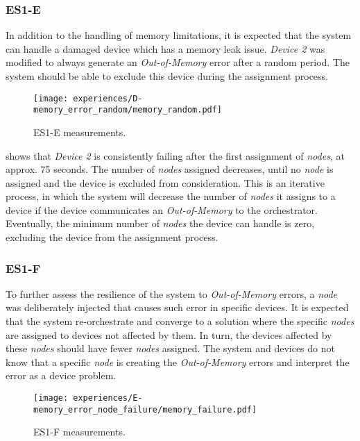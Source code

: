 
\subsubsection{ES1-E}

In addition to the handling of memory limitations, it is expected that the system can handle a damaged device which has a memory leak issue. \textit{Device 2} was modified to always generate an \textit{Out-of-Memory} error after a random period. The system should be able to exclude this device during the assignment process.

\begin{figure}[h]
\centering
\texttt{[image: experiences/D-memory\_error\_random/memory\_random.pdf]}
\caption[ES1-E measurements]{ES1-E measurements.}\label{fig:experiment_d_graph}
\end{figure}

 shows that \textit{Device 2} is consistently failing after the first assignment of \textit{nodes}, at approx. 75 seconds. The number of \textit{nodes} assigned decreases, until no \textit{node} is assigned and the device is excluded from consideration. This is an iterative process, in which the system will decrease the number of \textit{nodes} it assigns to a device if the device communicates an \textit{Out-of-Memory} to the orchestrator. Eventually, the minimum number of \textit{nodes} the device can handle is zero, excluding the device from the assignment process.


\subsubsection{ES1-F}

To further assess the resilience of the system to \textit{Out-of-Memory} errors, a \textit{node} was deliberately injected that causes such error in specific devices. It is expected that the system re-orchestrate and converge to a solution where the specific \textit{nodes} are assigned to devices not affected by them. In turn, the devices affected by these \textit{nodes} should have fewer \textit{nodes} assigned. The system and devices do not know that a specific \textit{node} is creating the \textit{Out-of-Memory} errors and interpret the error as a device problem.

\begin{figure}[H]
\centering
\texttt{[image: experiences/E-memory\_error\_node\_failure/memory\_failure.pdf]}
\caption[ES1-F measurements]{ES1-F measurements.}\label{fig:experiment_e_graph}
\end{figure}

